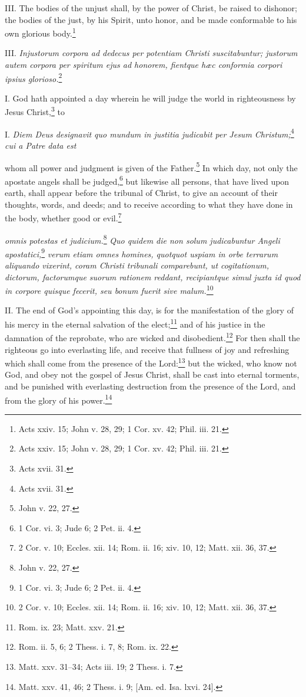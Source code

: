 III. The bodies of the unjust shall, by the power of Christ, be raised to dishonor; the bodies of the just, by his Spirit, unto honor, and be made conformable to his own glorious body.\footnote{Acts xxiv. 15; John v. 28, 29; 1 Cor. xv. 42; Phil. iii. 21.}

III. \emph{Injustorum corpora ad dedecus per potentiam Christi suscitabuntur; justorum autem corpora per spiritum ejus ad honorem, fientque hæc conformia corpori ipsius glorioso.}\footnote{Acts xxiv. 15; John v. 28, 29; 1 Cor. xv. 42; Phil. iii. 21.}


I. God hath appointed a day wherein he will judge the world in righteousness by Jesus Christ,\footnote{Acts xvii. 31.} to

I. \emph{Diem Deus designavit quo mundum in justitia judicabit per Jesum Christum;}\footnote{Acts xvii. 31.}\emph{ cui a Patre data est }

whom all power and judgment is given of the Father.\footnote{John v. 22, 27.} In which day, not only the apostate angels shall be judged,\footnote{1 Cor. vi. 3; Jude 6; 2 Pet. ii. 4.} but likewise all persons, that have lived upon earth, shall appear before the tribunal of Christ, to give an account of their thoughts, words, and deeds; and to receive according to what they have done in the body, whether good or evil.\footnote{2 Cor. v. 10; Eccles. xii. 14; Rom. ii. 16; xiv. 10, 12; Matt. xii. 36, 37.}

\emph{omnis potestas et judicium.}\footnote{John v. 22, 27.}\emph{ Quo quidem die non solum judicabuntur Angeli apostatici,}\footnote{1 Cor. vi. 3; Jude 6; 2 Pet. ii. 4.}\emph{ verum etiam omnes homines, quotquot uspiam in orbe terrarum aliquando vixerint, coram Christi tribunali comparebunt, ut cogitationum, dictorum, factorumque suorum rationem reddant, recipiantque simul juxta id quod in corpore quisque fecerit, seu bonum fuerit sive malum.}\footnote{2 Cor. v. 10; Eccles. xii. 14; Rom. ii. 16; xiv. 10, 12; Matt. xii. 36, 37.}

II. The end of God's appointing this day, is for the manifestation of the glory of his mercy in the eternal salvation of the elect;\footnote{Rom. ix. 23; Matt. xxv. 21.} and of his justice in the damnation of the reprobate, who are wicked and disobedient.\footnote{Rom. ii. 5, 6; 2 Thess. i. 7, 8; Rom. ix. 22.} For then shall the righteous go into everlasting life, and receive that fullness of joy and refreshing which shall come from the presence of the Lord:\footnote{Matt. xxv. 31–34; Acts iii. 19; 2 Thess. i. 7.} but the wicked, who know not God, and obey not the gospel of Jesus Christ, shall be cast into eternal torments, and be punished with everlasting destruction from the presence of the Lord, and from the glory of his power.\footnote{Matt. xxv. 41, 46; 2 Thess. i. 9; [Am. ed. Isa. lxvi. 24].}


